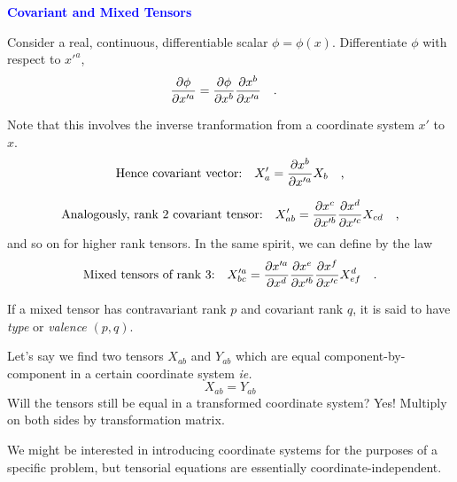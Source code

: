 \documentclass[landscape,aspectratio=169]{slides}
\begin{document}
\begin{slide}
	\textcolor{blue}{\textbf{Covariant and Mixed Tensors}}
	
	Consider a real, continuous, differentiable scalar $ \phi = \phi(x) $. Differentiate $ \phi $ with respect to $ x'^a $,
	\begin{equation}\label{key}
	\pdv{\phi}{x'^a} = \pdv{\phi}{x^b} \pdv{x^b}{x'^a} \qq{.}
	\end{equation}
	
	Note that this involves the inverse tranformation from a coordinate system $ x' $ to $ x $.
	\begin{equation}\label{key}
	 \qq{Hence covariant vector:}X'_a = \pdv{x^b}{x'^a} X_b \qq{,}
	\end{equation}
\end{slide}

\begin{slide}
	\begin{equation*}\label{key}
	\qq{Analogously, rank $ 2 $ covariant tensor:} X'_{ab} = \pdv{x^c}{x'^b} \pdv{x^d}{x'^c} X_{cd} \qq{,}
	\end{equation*}
	and so on for higher rank tensors. In the same spirit, we can define  by the law
	\begin{equation*}\label{key}
	\qq{Mixed tensors of rank 3:}
	X'^{a}_{bc} =  \pdv{x'^a}{x^d} \pdv{x^e}{x'^b} \pdv{x^f}{x'^c} X^d_{ef} \qq{.} 
	\end{equation*}
	
	If a mixed tensor has contravariant rank $ p $ and covariant rank $ q $, it is said to have \textit{type}  or \textit{valence} $ (p,q) $.
\end{slide}

\begin{slide}	
	Let's say we find two tensors $ X_{ab} $ and $ Y_{ab} $ which are equal component-by-component in a certain coordinate system \textit{ie.} $$ X_{ab} = Y_{ab} $$Will the tensors still be equal in a transformed coordinate system? Yes! Multiply on both sides by transformation matrix.

	We might be interested in introducing coordinate systems for the purposes of a specific problem, but tensorial equations are essentially coordinate-independent.
	
\end{slide}
\end{document}
